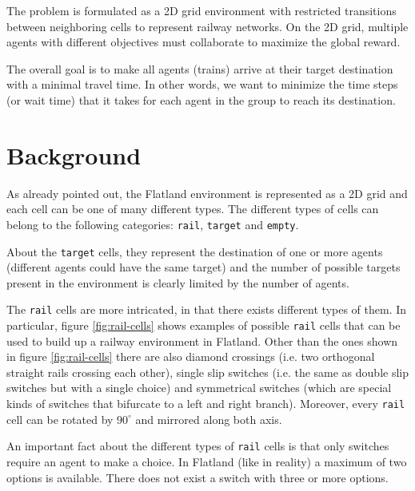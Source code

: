\documentclass[a4paper,10pt]{report}
\begin{document}
The problem is formulated as a 2D grid environment with restricted transitions between neighboring cells to represent railway networks. On the 2D grid, multiple agents with different objectives must collaborate to maximize the global reward.

The overall goal is to make all agents (trains) arrive at their target destination with a minimal travel time. In other words, we want to minimize the time steps (or wait time) that it takes for each agent in the group to reach its destination.


\chapter{Background}
As already pointed out, the Flatland environment is represented as a 2D grid and each cell can be one of many different types. The different types of cells can belong to the following categories: \texttt{rail}, \texttt{target} and \texttt{empty}.

About the \texttt{target} cells, they represent the destination of one or more agents (different agents could have the same target) and the number of possible targets present in the environment is clearly limited by the number of agents.

The \texttt{rail} cells are more intricated, in that there exists different types of them. In particular, figure \ref{fig:rail-cells} shows examples of possible \texttt{rail} cells that can be used to build up a railway environment in Flatland. Other than the ones shown in figure \ref{fig:rail-cells} there are also diamond crossings (i.e. two orthogonal straight rails crossing each other), single slip switches (i.e. the same as double slip switches but with a single choice) and symmetrical switches (which are special kinds of switches that bifurcate to a left and right branch). Moreover, every \texttt{rail} cell can be rotated by $90^{\circ}$ and mirrored along both axis.

An important fact about the different types of \texttt{rail} cells is that only switches require an agent to make a choice. In Flatland (like in reality) a maximum of two options is available. There does not exist a switch with three or more options.
\end{document}
